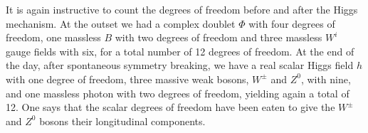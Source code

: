 \documentclass[../../Main/Main.tex]{subfiles}
\begin{document}
It is again instructive to count the degrees of freedom before and after the Higgs mechanism. At the outset we had a complex doublet \( \Phi  \)  with four degrees of freedom, one massless \( B \)  with two degrees of freedom and three massless \( W^i \)  gauge fields with six, for a total number of 12 degrees of freedom.
At the end of the day, after spontaneous symmetry breaking, we have a real scalar Higgs field \( h \)  with one degree of freedom, three massive weak bosons, \( W^{\pm} \) and \( Z^0 \), with nine, and one massless photon with two degrees of freedom, yielding again a total of 12. One says that the scalar degrees of freedom have been eaten to give the \( W^{\pm} \)  and \( Z^0 \) bosons their longitudinal components.
\end{document}

